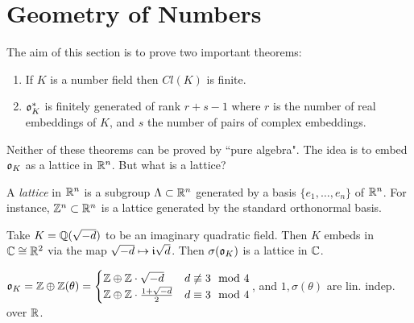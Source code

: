\documentclass[10pt,a4paper]{article}
\begin{document}
\section{Geometry of Numbers}
The aim of this section is to prove two important theorems:
\begin{enumerate}
\item If $K$ is a number field then $Cl(K)$ is finite.
\item $\mathfrak{o}_K^\ast$ is finitely generated of rank $r+s-1$ where $r$ is the number of real embeddings of $K$, and $s$ the number of pairs of complex embeddings.
\end{enumerate}
Neither of these theorems can be proved by ``pure algebra". The idea is to embed $\mathfrak{o}_K$ as a lattice in $\mathbb{R}^n$. But what is a lattice?

A \emph{lattice} in $\mathbb{R}^n$ is a subgroup $\Lambda \subset \mathbb{R}^n$ generated by a basis $\{e_1, \ldots, e_n\}$ of $\mathbb{R}^n$. For instance, $\mathbb{Z}^n \subset \mathbb{R}^n$ is a lattice generated by the standard orthonormal basis.

Take $K = \mathbb{Q}(\sqrt{-d})$ to be an imaginary quadratic field. Then $K$ embeds in $\mathbb{C} \cong \mathbb{R}^2$ via the map $\sqrt{-d} \mapsto \mathfrak{i}\sqrt{d}$. Then $\sigma(\mathfrak{o}_K)$ is a lattice in $\mathbb{C}$.

$\mathfrak{o}_K = \mathbb{Z}\oplus \mathbb{Z}(\theta) = \begin{cases} \mathbb{Z}\oplus \mathbb{Z}\cdot \sqrt{-d} & d \not\equiv 3 \mod 4\\ \mathbb{Z}\oplus \mathbb{Z}\cdot \frac{1+\sqrt{-d}}{2} & d \equiv 3 \mod 4\end{cases}$, and $1, \sigma(\theta)$ are lin. indep. over $\mathbb{R}$.
\end{document}

